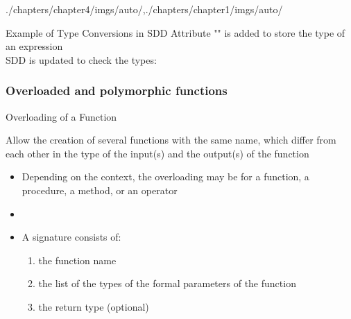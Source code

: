 \begin{graphicspathcontext}{{./chapters/chapter4/imgs/auto/},{./chapters/chapter1/imgs/auto/}}
\begin{bibunit}[apalike]
\begin{frame}{Example of Type Conversions in SDD}
	Attribute "" is added to store the type of an expression \\
	SDD is updated to check the types: \\
	\vspace{1em}
	\begin{sdd}
	\end{sdd}
\end{frame}

\subsubsection{Overloaded and polymorphic functions}
\subsubsectiontableofcontentslide

\begin{frame}{Overloading of a Function}
	\begin{definition}
		Allow the creation of several functions with the same name, which differ from each other in the type of the input(s) and the output(s) of the function
	\end{definition}
	\begin{itemize}
	\item Depending on the context, the overloading may be for a function, a procedure, a method, or an operator
	\vspace{.5cm}
	\item {}
	\vspace{.5cm}
	\item A signature consists of:
		\begin{enumerate}
		\item the function name
		\item the list of the types of the formal parameters of the function
		\item the return type (optional)
		\end{enumerate}
	\end{itemize}
\end{frame}


\end{bibunit}
\end{graphicspathcontext}

